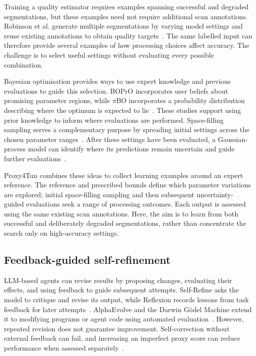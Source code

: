 \documentclass[a4paper,fleqn]{cas-dc}
\begin{document}
{Training a quality estimator requires examples spanning successful and degraded segmentations, but these examples need not require additional scan annotations. Robinson et al. generate multiple segmentations by varying model settings and reuse existing annotations to obtain quality targets~\cite{robinson2018segmentationQuality}. The same labelled input can therefore provide several examples of how processing choices affect accuracy. The challenge is to select useful settings without evaluating every possible combination.

Bayesian optimisation provides ways to use expert knowledge and previous evaluations to guide this selection. BOPrO incorporates user beliefs about promising parameter regions, while $\pi$BO incorporates a probability distribution describing where the optimum is expected to lie~\cite{souza2020prior,hvarfner2022pibo}. These studies support using prior knowledge to inform where evaluations are performed. Space-filling sampling serves a complementary purpose by spreading initial settings across the chosen parameter ranges~\cite{joe2008constructing}. After these settings have been evaluated, a Gaussian-process model can identify where its predictions remain uncertain and guide further evaluations~\cite{gramacy2009adaptive,gramacy2020surrogates}.

Proxy4Tun combines these ideas to collect learning examples around an expert reference. The reference and prescribed bounds define which parameter variations are explored; initial space-filling sampling and then subsequent uncertainty-guided evaluations seek a range of processing outcomes. Each output is assessed using the same existing scan annotations. Here, the aim is to learn from both successful and deliberately degraded segmentations, rather than concentrate the search only on high-accuracy settings.

\subsection{Feedback-guided self-refinement}

LLM-based agents can revise results by proposing changes, evaluating their effects, and using feedback to guide subsequent attempts. Self-Refine asks the model to critique and revise its output, while Reflexion records lessons from task feedback for later attempts~\cite{madaan2023selfrefine,shinn2023reflexion}. AlphaEvolve and the Darwin G\"odel Machine extend it to modifying programs or agent code using automated evaluation~\cite{novikov2025alphaevolve,zhang2025darwin}. However, repeated revision does not guarantee improvement. Self-correction without external feedback can fail, and increasing an imperfect proxy score can reduce performance when assessed separately~\cite{huang2024selfcorrect,gao2023overoptimization}.

}
\end{document}
